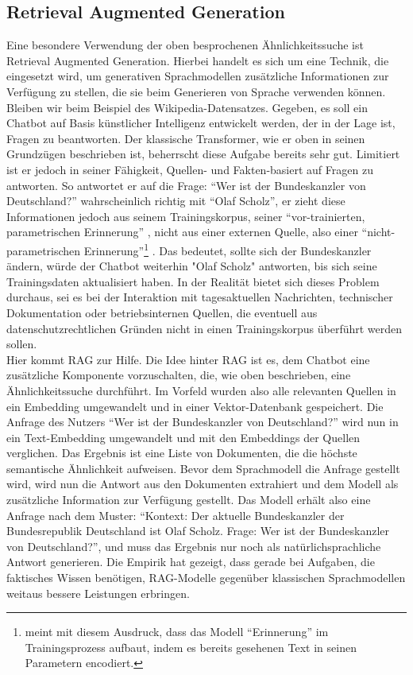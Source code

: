 \subsection{Retrieval Augmented Generation}
Eine besondere Verwendung der oben besprochenen Ähnlichkeitssuche ist Retrieval Augmented Generation. Hierbei handelt es sich um eine Technik, die eingesetzt wird, um generativen Sprachmodellen zusätzliche Informationen zur Verfügung zu stellen, die sie beim Generieren von Sprache verwenden können. Bleiben wir beim Beispiel des Wikipedia-Datensatzes. Gegeben, es soll ein Chatbot auf Basis künstlicher Intelligenz entwickelt werden, der in der Lage ist, Fragen zu beantworten. Der klassische Transformer, wie er oben in seinen Grundzügen beschrieben ist, beherrscht diese Aufgabe bereits sehr gut. Limitiert ist er jedoch in seiner Fähigkeit, Quellen- und Fakten-basiert auf Fragen zu antworten. So antwortet er auf die Frage: ``Wer ist der Bundeskanzler von Deutschland?'' wahrscheinlich richtig mit ``Olaf Scholz'', er zieht diese Informationen jedoch aus seinem Trainingskorpus, seiner ``vor-trainierten, parametrischen Erinnerung'' \parencite[S. 2]{DBLP:journals/corr/abs-2005-11401}, nicht aus einer externen Quelle, also einer ``nicht-parametrischen Erinnerung''\footnote{\cite{DBLP:journals/corr/abs-2005-11401} meint mit diesem Ausdruck, dass das Modell ``Erinnerung'' im Trainingsprozess aufbaut, indem es bereits gesehenen Text in seinen Parametern encodiert.} \parencite[S. 2]{DBLP:journals/corr/abs-2005-11401}. Das bedeutet, sollte sich der Bundeskanzler ändern, würde der Chatbot weiterhin "Olaf Scholz" antworten, bis sich seine Trainingsdaten aktualisiert haben. In der Realität bietet sich dieses Problem durchaus, sei es bei der Interaktion mit tagesaktuellen Nachrichten, technischer Dokumentation oder betriebsinternen Quellen, die eventuell aus datenschutzrechtlichen Gründen nicht in einen Trainingskorpus überführt werden sollen. \\

Hier kommt RAG zur Hilfe. Die Idee hinter RAG ist es, dem Chatbot eine zusätzliche Komponente vorzuschalten, die, wie oben beschrieben, eine Ähnlichkeitssuche durchführt. Im Vorfeld wurden also alle relevanten Quellen in ein Embedding umgewandelt und in einer Vektor-Datenbank gespeichert. Die Anfrage des Nutzers ``Wer ist der Bundeskanzler von Deutschland?'' wird nun in ein Text-Embedding umgewandelt und mit den Embeddings der Quellen verglichen. Das Ergebnis ist eine Liste von Dokumenten, die die höchste semantische Ähnlichkeit aufweisen. Bevor dem Sprachmodell die Anfrage gestellt wird, wird nun die Antwort aus den Dokumenten extrahiert und dem Modell als zusätzliche Information zur Verfügung gestellt. Das Modell erhält also eine Anfrage nach dem Muster: ``Kontext: Der aktuelle Bundeskanzler der Bundesrepublik Deutschland ist Olaf Scholz. Frage: Wer ist der Bundeskanzler von Deutschland?'', und muss das Ergebnis nur noch als natürlichsprachliche Antwort generieren. Die Empirik hat gezeigt, dass gerade bei Aufgaben, die faktisches Wissen benötigen, RAG-Modelle gegenüber klassischen Sprachmodellen weitaus bessere Leistungen erbringen. \parencite[Vgl. ][]{DBLP:journals/corr/abs-2005-11401}